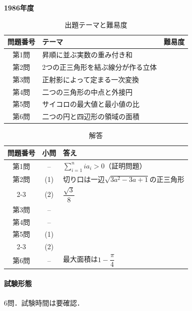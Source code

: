 \documentclass[../../main.tex]{subfiles}
\begin{document}
\begin{center}
  {\fontsize{48pt}{58pt}\selectfont \textbf{1986}\normalsize\textbf{年度}}
\end{center}

\begin{table}[htb]
  \centering
  \caption{出題テーマと難易度}
  \begin{tabular}{|c|p{9cm}|c|}
    \hline
    \textbf{問題番号} & \textbf{テーマ} & \textbf{難易度} \\
    \hline
    第1問 & 昇順に並ぶ実数の重み付き和 & \\
    \hline
    第2問 & 2つの正三角形を結ぶ線分が作る立体 & \\
    \hline
    第3問 & 正射影によって定まる一次変換 & \\
    \hline
    第4問 & 二つの三角形の中点と外接円 & \\
    \hline
    第5問 & サイコロの最大値と最小値の比 & \\
    \hline
    第6問 & 二つの円と四辺形の領域の面積 & \\
    \hline
  \end{tabular}
\end{table}

\begin{table}[htb]
  \centering
  \caption{解答}
  \renewcommand{\arraystretch}{1.4}
  \begin{tabular}{|c|c|p{9cm}|}
    \hline
    \textbf{問題番号} & \textbf{小問} & \textbf{答え} \\
    \hline
    第1問 & -- & $\sum_{i=1}^{n}ia_i>0$（証明問題） \\
    \hline
    第2問 & (1) & 切り口は一辺$\sqrt{3a^2-3a+1}$の正三角形 \\
    \cline{2-3}
    & (2) & $\dfrac{\sqrt{3}}{8}$ \\
    \hline
    第3問 & -- &  \\
    \hline
    第4問 & -- &  \\
    \hline
    第5問 & (1) &  \\
    \cline{2-3}
    & (2) &  \\
    \hline
    第6問 & -- & 最大面積は$1-\dfrac{\pi}{4}$ \\
    \hline
  \end{tabular}
\end{table}

\paragraph{試験形態}
6問．試験時間は要確認．
\end{document}
